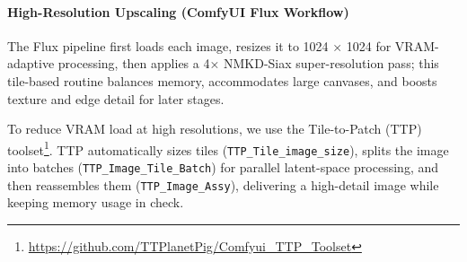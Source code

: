\documentclass[sigconf,nonacm]{acmart}
\begin{document}
\paragraph{High-Resolution Upscaling (ComfyUI Flux Workflow)}
The Flux pipeline first loads each image, resizes it to 1024 × 1024 for VRAM-adaptive processing, then applies a 4× NMKD-Siax super-resolution pass; this tile-based routine balances memory, accommodates large canvases, and boosts texture and edge detail for later stages.



To reduce VRAM load at high resolutions, we use the Tile-to-Patch (TTP) toolset\footnote{\url{https://github.com/TTPlanetPig/Comfyui_TTP_Toolset}}. TTP automatically sizes tiles    (\texttt{TTP\_\allowbreak Tile\_\allowbreak image\_\allowbreak size}), splits the image into batches (\texttt{TTP\_Image\_Tile\_Batch}) for parallel latent-space processing, and then reassembles them (\texttt{TTP\_Image\_Assy}), delivering a high-detail image while keeping memory usage in check.
\end{document}
